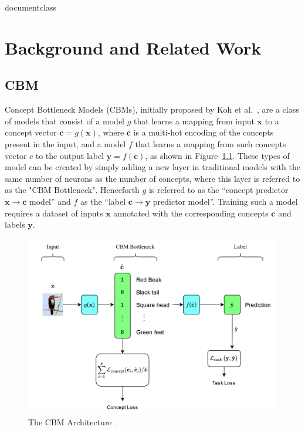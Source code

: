 \csname documentclass

\chapter{Background and Related Work}

\section{CBM}\label{background:cbm}

Concept Bottleneck Models (CBMs), initially proposed by Koh et al.~\cite{cbm}, are a class of models
that consist of a model $g$ that learns a mapping from
input $\mathbf{x}$ to a concept vector $\mathbf{c} = g(\mathbf{x})$, 
where $\mathbf{c}$ is a multi-hot encoding of the concepts present in the input,
and a model $f$
that learns a mapping from such concepts vector $c$
to the output label $\mathbf{y} = f(\mathbf{c})$, as shown in Figure~\ref{fig:cbm}.
These types of model can be created by simply adding a new layer in traditional models
with the same number of neurons as the number of concepts, where this layer
is referred to as the "CBM Bottleneck". 
Henceforth $g$ is referred to as the ``concept predictor $\mathbf{x} \to \mathbf{c}$ model'' and $f$ as the
``label $\mathbf{c} \to \mathbf{y}$ predictor model''.
 Training such a model requires a
dataset of inputs $\mathbf{x}$ annotated with the corresponding 
concepts $\mathbf{c}$ and labels $\mathbf{y}$. 

\begin{figure}[!h]
    \centering
    \includegraphics[width=\textwidth]{figs/background/cbm.png}
    \caption{The CBM Architecture~\cite{cbm}.}
    \label{fig:cbm}
\end{figure}


